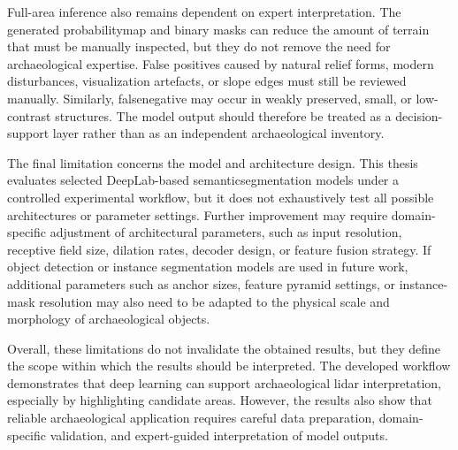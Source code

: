Full-area inference also remains dependent on expert interpretation. The generated \gls{probabilitymap} and binary masks can reduce the amount of terrain that must be manually inspected, but they do not remove the need for archaeological expertise. False positives caused by natural relief forms, modern disturbances, visualization artefacts, or \gls{slope} edges must still be reviewed manually. Similarly, \gls{falsenegative} may occur in weakly preserved, small, or low-contrast structures. The model output should therefore be treated as a decision-support layer rather than as an independent archaeological inventory.

The final limitation concerns the model and architecture design. This thesis evaluates selected DeepLab-based \gls{semanticsegmentation} models under a controlled experimental workflow, but it does not exhaustively test all possible architectures or parameter settings. Further improvement may require domain-specific adjustment of architectural parameters, such as input resolution, receptive field size, dilation rates, decoder design, or feature fusion strategy. If object detection or instance segmentation models are used in future work, additional parameters such as anchor sizes, feature pyramid settings, or instance-mask resolution may also need to be adapted to the physical scale and morphology of archaeological objects.

Overall, these limitations do not invalidate the obtained results, but they define the scope within which the results should be interpreted. The developed workflow demonstrates that deep learning can support archaeological \gls{lidar} interpretation, especially by highlighting candidate areas. However, the results also show that reliable archaeological application requires careful data preparation, domain-specific validation, and expert-guided interpretation of model outputs.
